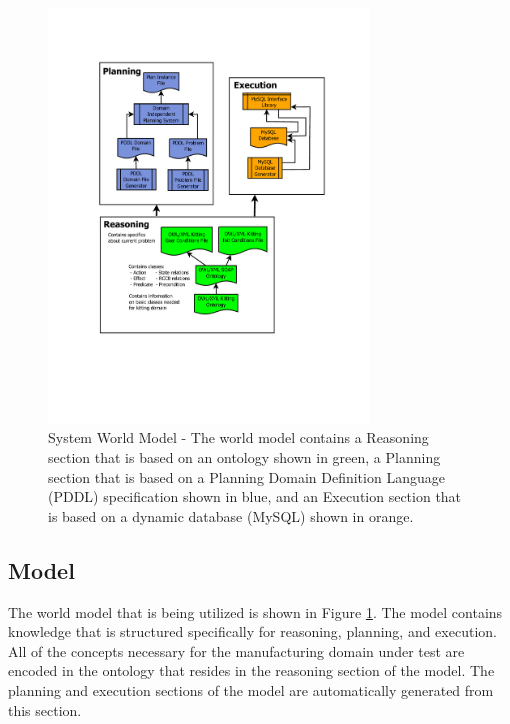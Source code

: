 \begin{figure}[htb!]
\begin{center}
\includegraphics[width=8.5cm]{images/RITAWorldModel.pdf}
\caption{System World Model - The world model contains a Reasoning section that is based on an ontology shown in green,
a Planning section that is based on a Planning Domain Definition Language (PDDL) specification shown in blue, and an Execution section that is based on a dynamic database (MySQL) shown in orange.}
\label{fig:WorldModel}
\end{center}
\end{figure}
%
\subsection{Model}
\label{subsection:Model}
The world model that is being utilized is shown in Figure \ref{fig:WorldModel}. The model contains knowledge that is structured specifically for
reasoning, planning, and execution. All of the concepts necessary for the manufacturing domain under test are
encoded in the ontology that resides in the reasoning section of the model. The planning and execution sections of the model are automatically generated from
this section.
%
